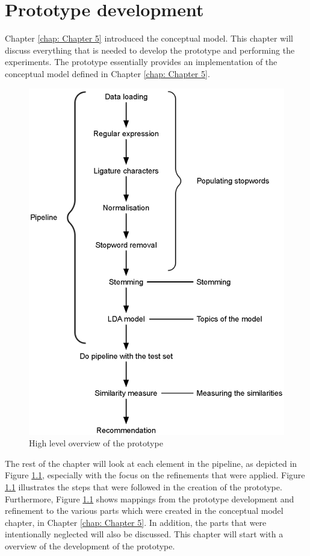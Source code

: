 \chapter{Prototype development}
\label{chap: Chapter 6}

Chapter \ref{chap: Chapter 5} introduced the conceptual model. This chapter will discuss everything that is needed to develop the prototype and performing the experiments. The prototype essentially provides an implementation of the conceptual model defined in Chapter \ref{chap: Chapter 5}.

\begin{figure}[h!]
\centering
\includegraphics[width=12cm]{./figures/flowresearch12.eps}
\caption{High level overview of the prototype}
\label{fig:prototype}
\end{figure}

The rest of the chapter will look at each element in the pipeline, as depicted in Figure \ref{fig:prototype}, especially with the focus on the refinements that were applied. Figure \ref{fig:prototype} illustrates the steps that were followed in the creation of the prototype. Furthermore, Figure \ref{fig:prototype} shows mappings from the prototype development and refinement to the various parts which were created in the conceptual model chapter, in Chapter \ref{chap: Chapter 5}. In addition, the parts that were intentionally neglected will also be discussed. This chapter will start with a overview of the development of the prototype.

